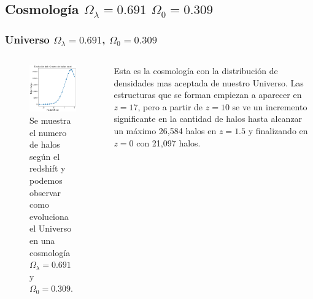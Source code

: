 \documentclass{beamer}
\begin{document}
\subsection{Cosmología \texorpdfstring{$\Omega_\lambda = 0.691$ $\Omega_0 = 0.309$}{Omega lambda = 0.691, Omega 0 = 0.309} }
	\begin{frame}
		\frametitle{Universo $\Omega_\lambda=0.691$, $\Omega_0=0.309$}
		\begin{columns}[t]
           	\begin{column}{.5\textwidth}

				\begin{figure}
					\centering
					\includegraphics[scale=0.38]{RunCanonica/TotalHalos_RunCanonica.png}
					\caption{\footnotesize Se muestra el numero de halos según el redshift y podemos observar como evoluciona el Universo en una cosmología $\Omega_\lambda = 0.691 $ y $\Omega_0 = 0.309$.}
					\label{fig:TotalHalos_CanonRun}
				\end{figure}

	        \end{column}
			\vspace{0.5cm}
    	    \begin{column}{.5\textwidth}

    	    	Esta es la cosmología con la distribución de densidades mas aceptada de nuestro Universo. Las estructuras que se forman empiezan a aparecer en $z=17$, pero a partir de $z=10$ se ve un incremento significante en la cantidad de halos hasta alcanzar un máximo 26,584 halos en $z = 1.5$ y finalizando en $z=0$ con 21,097 halos.

        	\end{column}
	    \end{columns}

	\end{frame}
\end{document}
